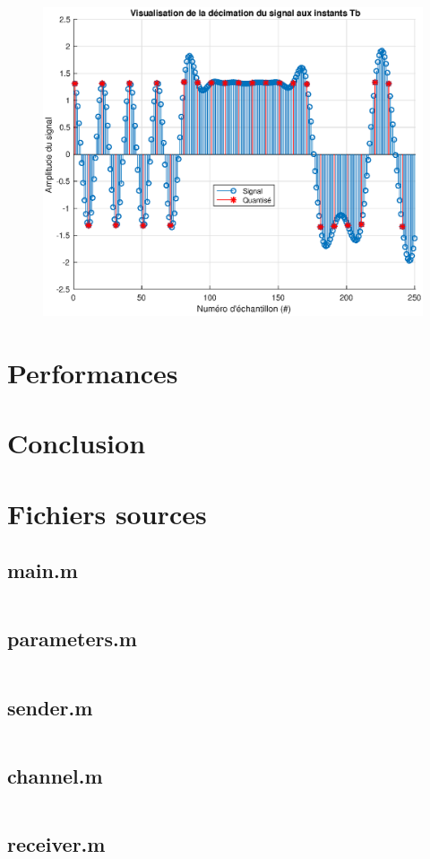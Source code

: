 \documentclass[10pt, oneside, a4paper]{article}
\begin{document}
\begin{figure}[htbp]
	\includegraphics[width=\textwidth]{eps/decimate.eps}
	\caption{}
	\label{fig:decimate}
\end{figure}


\section{Performances}


\section{Conclusion}

\appendix
\newpage

\section{Fichiers sources}
\label{sec:fichiers-sources}

\subsection{main.m}
\inputminted{matlab}{../main.m}
\label{app:main}

\subsection{parameters.m}
\inputminted{matlab}{../parameters.m}
\label{app:paremeters}

\subsection{sender.m}
\inputminted{matlab}{../sender.m}
\label{app:sender}

\subsection{channel.m}
\inputminted{matlab}{../channel.m}
\label{app:channel}

\subsection{receiver.m}
\inputminted{matlab}{../receiver.m}
\label{app:receiver}
\end{document}
